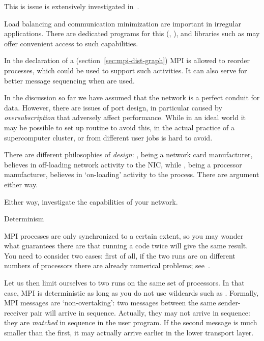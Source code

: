 This is issue is extensively investigated in~\cite{Eijkhout:MPItype-arxiv}.


Load balancing and communication minimization are important in
irregular applications. There are dedicated programs for this
(, ), and libraries such as
 may offer convenient access to such capabilities.

In the declaration of a 
  (section~\ref{sec:mpi-dist-graph}) MPI is allowed to
reorder processes, which could be used to support such activities.
It can also serve for better message sequencing when
 are used.


In the discussion so far we have assumed that the network is a perfect
conduit for data. However, there are issues of port design, in
particular caused by
\emph{oversubscription} that
adversely affect performance. While in an ideal world it may be
possible to set up routine to avoid this, in the actual practice of a
supercomputer cluster,  or
 from
different user jobs is hard to avoid.


There are different philosophies of 
\emph{design}: , being a network card manufacturer,
believes in off-loading network activity to the \ac{NIC}, while
, being a processor manufacturer, believes in
`on-loading' activity to the process. There are argument either way.

Either way, investigate the capabilities of your network.

 {Determinism}
\label{sec:mpi-semantics}

MPI processes are only synchronized to a certain extent, so you may
wonder what guarantees there are that running a code twice will give
the same result.  You need to consider two cases: first of all, if the
two runs are on different numbers of processors there are already
numerical problems; see~.

Let us then limit ourselves to two runs on the same set of processors. 
In that case, MPI is deterministic as long as you do not use 
wildcards such as . Formally, 
MPI messages are `non-overtaking': two messages between the same
sender-receiver pair will arrive in sequence.
Actually, they may not arrive in sequence: they are \emph{matched}
in sequence in the user program. If the second message is much smaller than the first,
it may actually arrive earlier in the lower transport layer.

